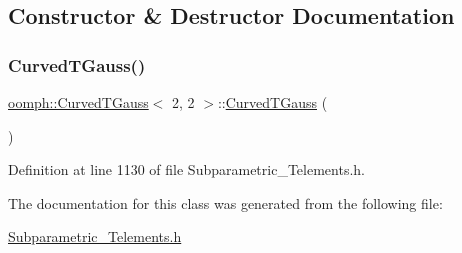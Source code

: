 \subsection{Constructor \& Destructor Documentation}
\mbox{\label{classoomph_1_1CurvedTGauss_3_012_00_012_01_4_af5146d11a77146251cdcf69f22a6d029}} 
\subsubsection{\texorpdfstring{Curved\+T\+Gauss()}{CurvedTGauss()}}
{\footnotesize\ttfamily \hyperlink{classoomph_1_1CurvedTGauss}{oomph\+::\+Curved\+T\+Gauss}$<$ 2, 2 $>$\+::\hyperlink{classoomph_1_1CurvedTGauss}{Curved\+T\+Gauss} (\begin{DoxyParamCaption}{ }\end{DoxyParamCaption})\hspace{0.3cm}{\ttfamily [inline]}}



Definition at line 1130 of file Subparametric\+\_\+\+Telements.\+h.



The documentation for this class was generated from the following file\+:\begin{DoxyCompactItemize}
\item 
\hyperlink{Subparametric__Telements_8h}{Subparametric\+\_\+\+Telements.\+h}\end{DoxyCompactItemize}
